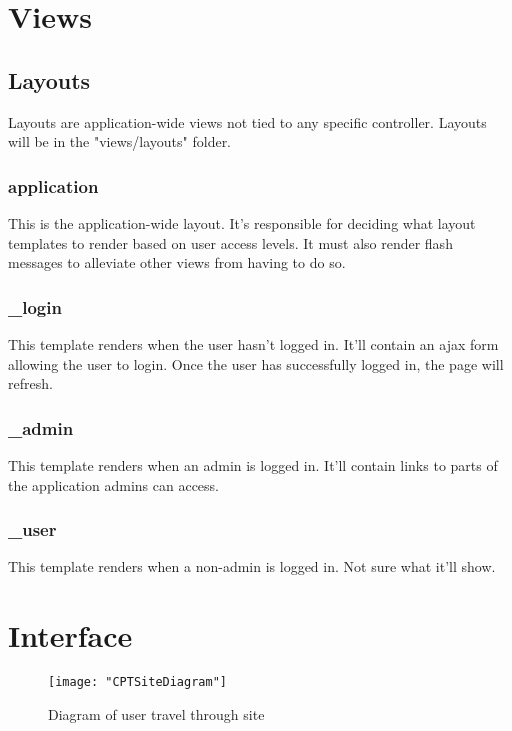 \documentclass[12pt]{article}
\begin{document}
\section{Views}
\subsection{Layouts}
Layouts are application-wide views not tied to any specific controller. Layouts will be in the "views/layouts" folder.
\subsubsection{application}
This is the application-wide layout. It's responsible for deciding what layout templates to render based on user access levels.
It must also render flash messages to alleviate other views from having to do so.
\subsubsection{\_login}
This template renders when the user hasn't logged in. It'll contain an ajax form allowing the user to login.
Once the user has successfully logged in, the page will refresh.
\subsubsection{\_admin}
This template renders when an admin is logged in. It'll contain links to parts of the application admins can access.
\subsubsection{\_user}
This template renders when a non-admin is logged in. Not sure what it'll show.


\section{Interface}\label{sec:Interface}
\begin{figure}[H]
\begin{center}
\texttt{[image: "CPTSiteDiagram"]}
\caption{Diagram of user  travel through site}
\label{fig:dia}
\end{center}
\end{figure}
\end{document}
